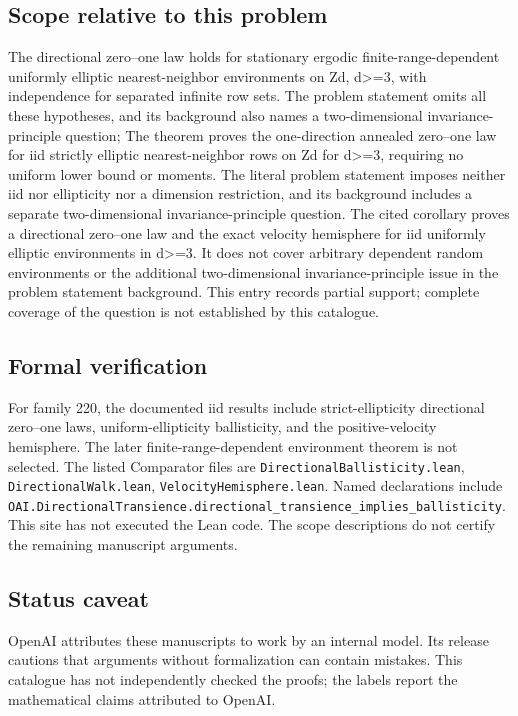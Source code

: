 \documentclass[11pt]{article}
\begin{document}
\subsection{Scope relative to this problem}
The directional zero–one law holds for stationary ergodic finite-range-dependent uniformly elliptic nearest-neighbor environments on Zd, d>=3, with independence for separated infinite row sets. The problem statement omits all these hypotheses, and its background also names a two-dimensional invariance-principle question; The theorem proves the one-direction annealed zero–one law for iid strictly elliptic nearest-neighbor rows on Zd for d>=3, requiring no uniform lower bound or moments. The literal problem statement imposes neither iid nor ellipticity nor a dimension restriction, and its background includes a separate two-dimensional invariance-principle question. The cited corollary proves a directional zero–one law and the exact velocity hemisphere for iid uniformly elliptic environments in d>=3. It does not cover arbitrary dependent random environments or the additional two-dimensional invariance-principle issue in the problem statement background. This entry records partial support; complete coverage of the question is not established by this catalogue.

\subsection{Formal verification}
For family 220, the documented iid results include strict-ellipticity directional zero--one laws, uniform-ellipticity ballisticity, and the positive-velocity hemisphere. The later finite-range-dependent environment theorem is not selected. The listed Comparator files are \texttt{DirectionalBallisticity.lean}, \texttt{DirectionalWalk.lean}, \texttt{VelocityHemisphere.lean}. Named declarations include \texttt{OAI.DirectionalTransience.directional\_transience\_implies\_ballisticity}. This site has not executed the Lean code. The scope descriptions do not certify the remaining manuscript arguments.

\subsection{Status caveat}
OpenAI attributes these manuscripts to work by an internal model. Its release cautions that arguments without formalization can contain mistakes. This catalogue has not independently checked the proofs; the labels report the mathematical claims attributed to OpenAI.
\end{document}
